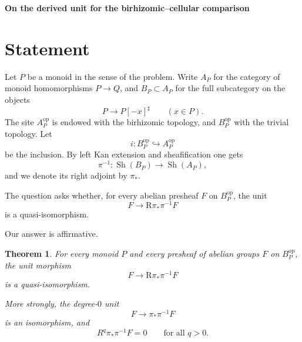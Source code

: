 \documentclass[11pt]{article}
\newtheorem{theorem}{Theorem}
\theoremstyle{remark}
\newcommand{\Sh}{\operatorname{Sh}}
\newcommand{\R}{\mathrm{R}}
\begin{document}
\begin{center}
{\Large \textbf{On the derived unit for the birhizomic--cellular comparison}}\\[1ex]
\end{center}

\begin{abstract}
We prove that the morphism of topoi
\[
\pi\colon \Sh(A_P)\longrightarrow \Sh(B_P)
\]
introduced in the question is cohomologically fully faithful on the essential image of
$\pi^{-1}$.  More precisely, for every presheaf of abelian groups $F$ on $B_P^{\mathrm{op}}$
(the same thing as a sheaf, since $B_P^{\mathrm{op}}$ has the trivial topology), the unit
\[
F\longrightarrow \R\pi_*\pi^{-1}F
\]
is a quasi-isomorphism.  In fact, we prove the stronger statement that
\[
F \xrightarrow{\;\sim\;} \pi_*\pi^{-1}F,
\qquad
R^q\pi_*\pi^{-1}F=0\quad(q>0).
\]
The proof is a formal reduction to the affine acyclicity theorem for Olsson cones
(Battistella--Carocci--Wise), together with an elementary slice-site argument.
\end{abstract}

\section{Statement}

Let $P$ be a monoid in the sense of the problem.
Write $A_P$ for the category of monoid homomorphisms $P\to Q$, and
$B_P\subset A_P$ for the full subcategory on the objects
\[
P\longrightarrow P[-x]^\sharp
\qquad (x\in P).
\]
The site $A_P^{\mathrm{op}}$ is endowed with the birhizomic topology, and
$B_P^{\mathrm{op}}$ with the trivial topology.  Let
\[
i\colon B_P^{\mathrm{op}}\hookrightarrow A_P^{\mathrm{op}}
\]
be the inclusion.  By left Kan extension and sheafification one gets
\[
\pi^{-1}\colon \Sh(B_P)\longrightarrow \Sh(A_P),
\]
and we denote its right adjoint by $\pi_*$.

The question asks whether, for every abelian presheaf $F$ on $B_P^{\mathrm{op}}$,
the unit
\[
F\longrightarrow \R\pi_*\pi^{-1}F
\]
is a quasi-isomorphism.

Our answer is affirmative.

\begin{theorem}\label{thm:main}
For every monoid $P$ and every presheaf of abelian groups $F$ on $B_P^{\mathrm{op}}$,
the unit morphism
\[
F\longrightarrow \R\pi_*\pi^{-1}F
\]
is a quasi-isomorphism.

More strongly, the degree-$0$ unit
\[
F\longrightarrow \pi_*\pi^{-1}F
\]
is an isomorphism, and
\[
R^q\pi_*\pi^{-1}F=0
\qquad\text{for all }q>0.
\]
\end{theorem}
\end{document}
